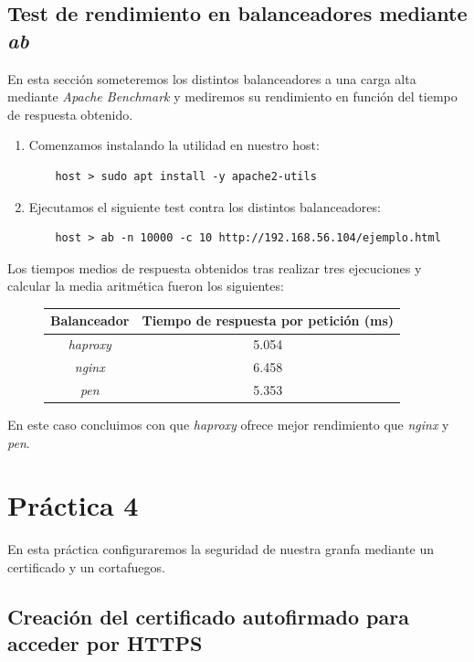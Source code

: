 \documentclass[12pt,spanish]{article}
\begin{document}
\subsection{Test de rendimiento en balanceadores mediante \emph{ab}}
En esta sección someteremos los distintos balanceadores a una carga alta mediante \emph{Apache Benchmark} y mediremos su rendimiento en función del tiempo de respuesta obtenido.
\begin{enumerate}
	\item Comenzamos instalando la utilidad en nuestro host:
	\begin{lstlisting}
	host > sudo apt install -y apache2-utils
	\end{lstlisting}
	\item Ejecutamos el siguiente test contra los distintos balanceadores:
	\begin{lstlisting}
	host > ab -n 10000 -c 10 http://192.168.56.104/ejemplo.html
	\end{lstlisting}
\end{enumerate}
Los tiempos medios de respuesta obtenidos tras realizar tres ejecuciones y calcular la media aritmética fueron los siguientes:
\begin{figure}[H]
	\centering
	\begin{tabular}{|c|c|}
		\hline
		\textbf{Balanceador} & \textbf{Tiempo de respuesta por petición (ms)} \\
		\hline
		\emph{haproxy} & 5.054 \\
		\hline
		\emph{nginx} & 6.458 \\
		\hline
		\emph{pen} & 5.353 \\
		\hline
	\end{tabular}
\end{figure}
En este caso concluimos con que \emph{haproxy} ofrece mejor rendimiento que \emph{nginx} y \emph{pen}.

\section{Práctica 4}

En esta práctica configuraremos la seguridad de nuestra granfa mediante un certificado y un cortafuegos.

\subsection{Creación del certificado autofirmado para acceder por HTTPS}
\end{document}
